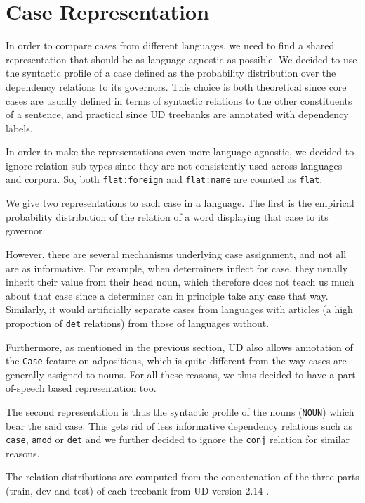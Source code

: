 \section{Case Representation}

In order to compare cases from different languages, we need to find a shared representation that should be as language agnostic as possible.
We decided to use the syntactic profile of a case defined as the probability distribution over the dependency relations to its governors.
This choice is both theoretical since core cases are usually defined in terms of syntactic relations to the other constituents of a sentence, and practical since UD treebanks are annotated with dependency labels.

In order to make the representations even more language agnostic, we decided to ignore relation sub-types since they are not consistently used across languages and corpora.
So, both \texttt{flat:foreign} and \texttt{flat:name} are counted as \texttt{flat}.

We give two representations to each case in a language.
The first is the empirical probability distribution of the relation of a word displaying that case to its governor.

However, there are several mechanisms underlying case assignment, and not all are as informative.
For example, when determiners inflect for case, they usually inherit their value from their head noun, which therefore does not teach us much about that case since a determiner can in principle take any case that way.
Similarly, it would artificially separate cases from languages with articles (a high proportion of \texttt{det} relations) from those of languages without.

Furthermore, as mentioned in the previous section, UD also allows annotation of the \texttt{Case} feature on adpositions, which is quite different from the way cases are generally assigned to nouns.
For all these reasons, we thus decided to have a part-of-speech based representation too.

The second representation is thus the syntactic profile of the nouns (\texttt{NOUN}) which bear the said case.
This gets rid of less informative dependency relations such as \texttt{case}, \texttt{amod} or \texttt{det} and we further decided to ignore the \texttt{conj} relation for similar reasons.

The relation distributions are computed from the concatenation of the three parts (train, dev and test) of each treebank from UD version 2.14 \cite{UD214}.